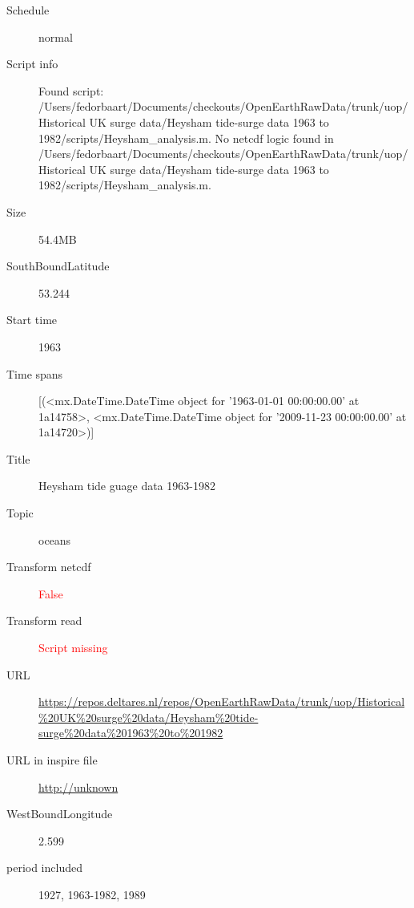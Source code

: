 \documentclass[9]{report}
\begin{document}
\begin{description}
\begin{verbatim}
\end{verbatim}
  \item[Schedule] normal
  \item[Script info] Found script: /Users/fedorbaart/Documents/checkouts/OpenEarthRawData/trunk/uop/Historical UK surge data/Heysham tide-surge data 1963 to 1982/scripts/Heysham\_analysis.m.
No netcdf logic found in /Users/fedorbaart/Documents/checkouts/OpenEarthRawData/trunk/uop/Historical UK surge data/Heysham tide-surge data 1963 to 1982/scripts/Heysham\_analysis.m.
  \item[Size] 54.4MB
  \item[SouthBoundLatitude] 53.244
  \item[Start time] 1963
  \item[Time spans] [(<mx.DateTime.DateTime object for '1963-01-01 00:00:00.00' at 1a14758>, <mx.DateTime.DateTime object for '2009-11-23 00:00:00.00' at 1a14720>)]
  \item[Title]  Heysham tide guage data 1963-1982 
  \item[Topic] oceans
  \item[Transform netcdf] \textcolor{red}{False}
  \item[Transform read] \textcolor{red}{Script missing}
  \item[URL] \href{https://repos.deltares.nl/repos/OpenEarthRawData/trunk/uop/Historical\%20UK\%20surge\%20data/Heysham\%20tide-surge\%20data\%201963\%20to\%201982}{https://repos.deltares.nl/repos/OpenEarthRawData/trunk/uop/Historical\%20UK\%20surge\%20data/Heysham\%20tide-surge\%20data\%201963\%20to\%201982}
  \item[URL in inspire file] \href{http://unknown}{http://unknown}
  \item[WestBoundLongitude] 2.599
  \item[period included] 1927, 1963-1982, 1989
\end{description}
\end{document}
